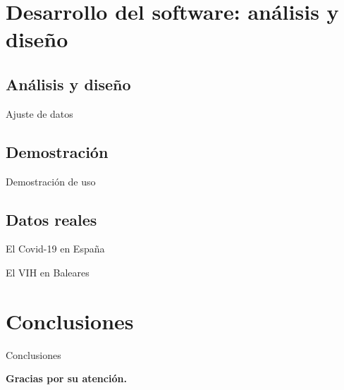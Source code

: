 

\section{Desarrollo del software: análisis y diseño}


\subsection{Análisis y diseño}


\begin{frame}{}

\end{frame}


\begin{frame}{Ajuste de datos}

\end{frame}


\subsection{Demostración}


\begin{frame}{Demostración de uso}

\end{frame}


\subsection{Datos reales}


\begin{frame}{El Covid-19 en España}

\end{frame}


\begin{frame}{El VIH en Baleares}

\end{frame}




\section{Conclusiones}


\begin{frame}{Conclusiones}

\end{frame}




\begin{frame}[c]{}
\begin{center}
\large{\textbf{Gracias por su atención.}}
\end{center}
\end{frame}
